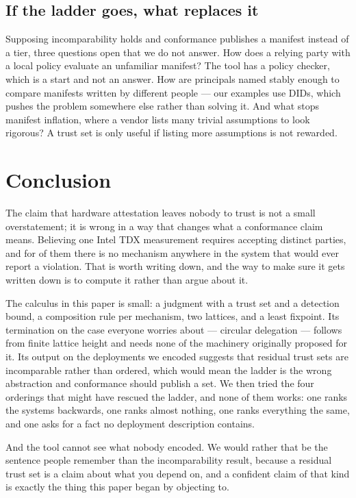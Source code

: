 \documentclass[11pt]{article}
\begin{document}
\subsection{If the ladder goes, what replaces it}

Supposing incomparability holds and conformance publishes a manifest instead
of a tier, three questions open that we do not answer. How does a relying
party with a local policy evaluate an unfamiliar manifest? The tool has a
policy checker, which is a start and not an answer. How are principals named
stably enough to compare manifests written by different people --- our
examples use DIDs, which pushes the problem somewhere else rather than solving
it. And what stops manifest inflation, where a vendor lists many trivial
assumptions to look rigorous? A trust set is only useful if listing more
assumptions is not rewarded.

\section{Conclusion}

The claim that hardware attestation leaves nobody to trust is not a small
overstatement; it is wrong in a way that changes what a conformance claim
means. Believing one Intel TDX measurement requires accepting
\SigmaTwoParties{} distinct
parties, and for \SigmaTwoUndetectable{} of them there is no mechanism anywhere in the system
that would ever report a violation. That is worth writing down, and the way
to make sure it gets written down is to compute it rather than argue about it.

The calculus in this paper is small: a judgment with a trust set and a
detection bound, a composition rule per mechanism, two lattices, and a least
fixpoint. Its termination on the case everyone worries about --- circular
delegation --- follows from finite lattice height and needs none of the
machinery originally proposed for it. Its output on the deployments we encoded
suggests that residual trust sets are incomparable rather than ordered, which
would mean the ladder is the wrong abstraction and conformance should publish
a set. We then tried the four orderings that might have rescued the ladder,
and none of them works: one ranks the systems backwards, one ranks almost
nothing, one ranks everything the same, and one asks for a fact no deployment
description contains.

And the tool cannot see what nobody encoded. We would rather that be the
sentence people remember than the incomparability result, because a residual
trust set is a claim about what you depend on, and a confident claim of that
kind is exactly the thing this paper began by objecting to.
\end{document}
